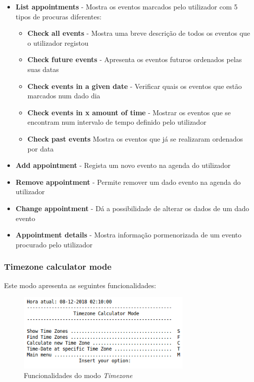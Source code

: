 \documentclass{article}
\begin{document}
\begin{itemize}
    \item \textbf{List appointments} - Mostra os eventos marcados pelo utilizador com 5 tipos de procuras diferentes:
        \begin{itemize}
            \item \textbf{Check all events} - Mostra uma breve descrição de todos os eventos que o utilizador registou
            \item \textbf{Check future events} - Apresenta os eventos futuros ordenados pelas suas datas
            \item \textbf{Check events in a given date} - Verificar quais os eventos que estão marcados num dado dia
            \item \textbf{Check events in x amount of time} - Mostrar os eventos que se encontram num intervalo de tempo definido pelo utilizador
            \item \textbf{Check past events} Mostra os eventos que já se realizaram ordenados por data
        \end{itemize}
    \item \textbf{Add appointment} - Regista um novo evento na agenda do utilizador
    \item \textbf{Remove appointment} - Permite remover um dado evento na agenda do utilizador
    \item \textbf{Change appointment} - Dá a possibilidade de alterar os dados de um dado evento
    \item \textbf{Appointment details} - Mostra informação pormenorizada de um evento procurado pelo utilizador
\end{itemize}

\subsubsection{Timezone calculator mode}
Este modo apresenta as seguintes funcionalidades:

\begin{figure}[H]
    \centering
    \includegraphics[width=8.5cm]{timezone.png}
    \caption{Funcionalidades do modo \textit{Timezone}}
\end{figure}
\end{document}
